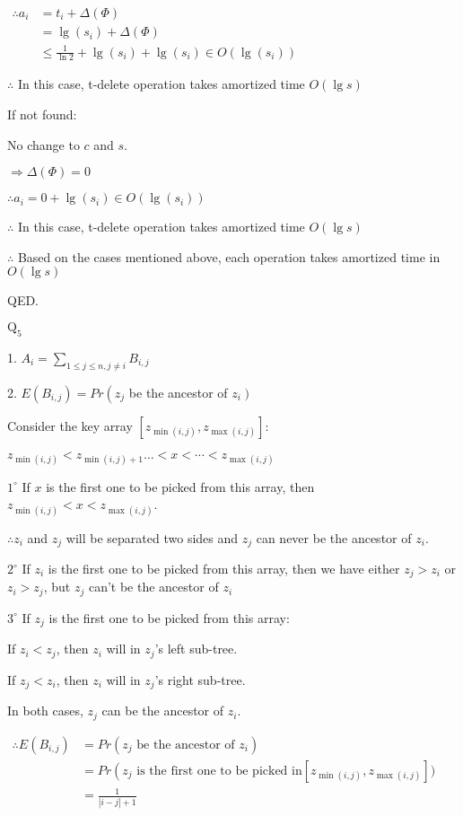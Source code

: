 \documentclass[12pt]{article}
\begin{document}
$\begin{aligned}\therefore a_i & =t_i+\Delta(\Phi) \\
& =\lg \left(s_i\right)+\Delta(\Phi) \\
&\leqslant \frac{1}{\ln2}+\lg \left(s_i\right)+\lg \left(s_i\right) \in O\left(\lg \left(s_i\right)\right)
\end{aligned} $

$\therefore $  In this case, t-delete operation takes amortized time $O(\lg s)$ 

If not found:

No change to $c$ and $s$.

$ \Rightarrow \Delta(\Phi)=0 $

$ \therefore a_i=0+\lg\left(s_i\right) \in O\left(\lg \left(s_i\right)\right)$


$\therefore$ In this case, t-delete operation takes amortized time $O(\lg s)$

$\therefore$ Based on the cases mentioned above, each operation takes amortized time in $O(\lg s)$

QED.

\newpage
$\text{Q}_{5}$

1. $A_i=\sum\limits_{1\le j\le  n, j\ne i} B_{i, j}$

2. $E\left(B_{i, j}\right)= Pr\left(z_j\right.$ be the ancestor of $\left.z_i\right)$

Consider the key array $\left[z_{\min(i,j)}, z_{\max(i,j)}\right]$:

$z_{\min(i,j)}<z_{\min(i,j)+1} \ldots<x<\cdots<z_{\max(i ,j) }$

$1^{\circ}$ If $x$ is the first one to be picked from this array, then $z_{\min(i,j)}<x<z_{\max(i,j)}$. 

$\therefore z_i$ and $z_j$ will be separated two sides and $z_j$ can never be the ancestor of $z_i$.

$2^{\circ}$ If $z_i$ is the first one to be picked from this array, then we have either $z_j>z_i$ or $z_i>z_j$, but $z_j$ can't be the ancestor of $z_i$

$3^{\circ}$ If $z_j$ is the first one to be picked from this array:

If $z_i<z_j$, then $z_i$ will in $z_j$'s left sub-tree.

If $z_j<z_i$, then $z_i$ will in $z_j$'s right sub-tree.

In both cases, $z_j$ can be the ancestor of $z_i$.

$\begin{aligned}\therefore E\left(B_{i, j}\right)&= Pr\left(z_j \text { be the ancestor of } z_i\right)\\
&
= Pr\left(z_j\right.\text { is the first one to be picked in} \left[z_{\min(i, j)}, z_{\max( i, j)}\right])\\
&
=\frac{1}{|i-j|+1}
\end{aligned} $
\end{document}
